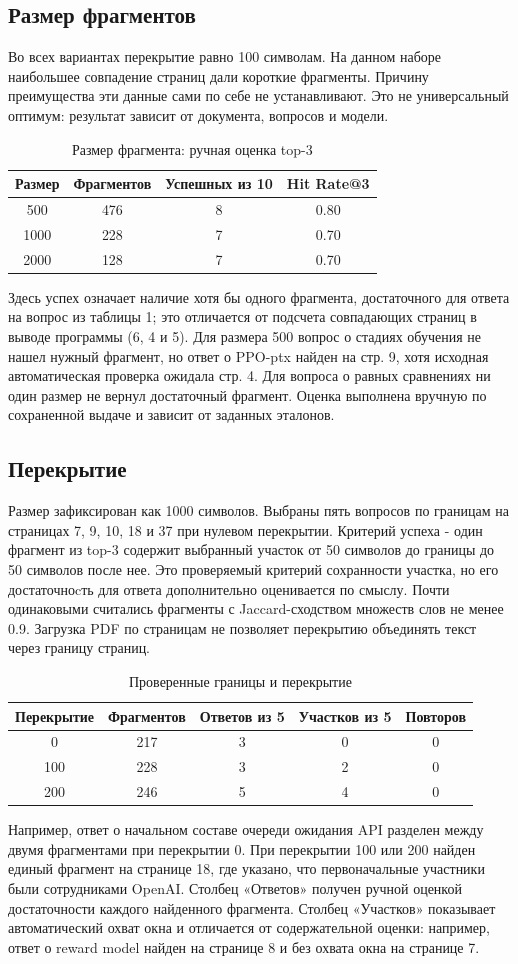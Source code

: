 \documentclass[12pt,a4paper]{article}
\begin{document}
\subsection{Размер фрагментов}
Во всех вариантах перекрытие равно 100 символам. На данном наборе наибольшее совпадение страниц дали короткие фрагменты. Причину преимущества эти данные сами по себе не устанавливают. Это не универсальный оптимум: результат зависит от документа, вопросов и модели.
\begin{table}[H]\centering\caption{Размер фрагмента: ручная оценка top-3}\begin{tabular}{cccc}\toprule Размер&Фрагментов&Успешных из 10&Hit Rate@3\\\midrule 500&476&8&0.80\\1000&228&7&0.70\\2000&128&7&0.70\\\bottomrule\end{tabular}\end{table}
Здесь успех означает наличие хотя бы одного фрагмента, достаточного для ответа на вопрос из таблицы 1; это отличается от подсчета совпадающих страниц в выводе программы (6, 4 и 5). Для размера 500 вопрос о стадиях обучения не нашел нужный фрагмент, но ответ о PPO-ptx найден на стр. 9, хотя исходная автоматическая проверка ожидала стр. 4. Для вопроса о равных сравнениях ни один размер не вернул достаточный фрагмент. Оценка выполнена вручную по сохраненной выдаче и зависит от заданных эталонов.

\subsection{Перекрытие}
Размер зафиксирован как 1000 символов. Выбраны пять вопросов по границам на страницах 7, 9, 10, 18 и 37 при нулевом перекрытии. Критерий успеха - один фрагмент из top-3 содержит выбранный участок от 50 символов до границы до 50 символов после нее. Это проверяемый критерий сохранности участка, но его достаточноcть для ответа дополнительно оценивается по смыслу. Почти одинаковыми считались фрагменты с Jaccard-сходством множеств слов не менее 0.9. Загрузка PDF по страницам не позволяет перекрытию объединять текст через границу страниц.
\begin{table}[H]\centering\caption{Проверенные границы и перекрытие}\begin{tabular}{ccccc}\toprule Перекрытие&Фрагментов&Ответов из 5&Участков из 5&Повторов\\\midrule 0&217&3&0&0\\100&228&3&2&0\\200&246&5&4&0\\\bottomrule\end{tabular}\end{table}
Например, ответ о начальном составе очереди ожидания API разделен между двумя фрагментами при перекрытии 0. При перекрытии 100 или 200 найден единый фрагмент на странице 18, где указано, что первоначальные участники были сотрудниками OpenAI. Столбец «Ответов» получен ручной оценкой достаточности каждого найденного фрагмента. Столбец «Участков» показывает автоматический охват окна и отличается от содержательной оценки: например, ответ о reward model найден на странице 8 и без охвата окна на странице 7.
\end{document}
